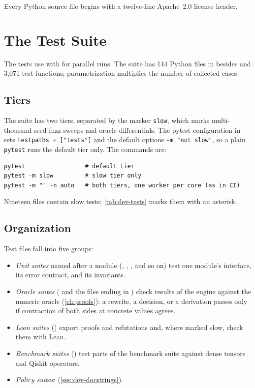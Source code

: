 Every Python source file begins with a twelve-line Apache~2.0 license header.

\section{The Test Suite}\label{sec:dev-tests}

The tests use  with  for parallel runs. The suite has 144 Python files in  besides  and 3{,}071 test functions; parametrization multiplies the number of collected cases.

\subsection{Tiers}\label{sec:dev-tiers}

The suite has two tiers, separated by the marker \texttt{slow}, which marks multi-thousand-seed fuzz sweeps and oracle differentials. The pytest configuration in  sets \texttt{testpaths = ["tests"]} and the default options \texttt{-m "not slow"}, so a plain \texttt{pytest} runs the default tier only. The commands are:
\begin{lstlisting}[style=shell]
pytest                 # default tier
pytest -m slow         # slow tier only
pytest -m "" -n auto   # both tiers, one worker per core (as in CI)
\end{lstlisting}
Nineteen files contain slow tests; \cref{tab:dev-tests} marks them with an asterisk.

\subsection{Organization}\label{sec:dev-test-organization}

Test files fall into five groups:
\begin{itemize}
\item \emph{Unit suites} named after a module (, , , and so on) test one module's interface, its error contract, and its invariants.
\item \emph{Oracle suites} ( and the files ending in ) check results of the engine against the numeric oracle (\cref{ch:proofs}): a rewrite, a decision, or a derivation passes only if contraction of both sides at concrete values agrees.
\item \emph{Lean suites} () export proofs and refutations and, where marked slow, check them with Lean.
\item \emph{Benchmark suites} () test parts of the benchmark suite against dense tensors and Qiskit operators.
\item \emph{Policy suites}:  (\cref{sec:dev-docstrings}).
\end{itemize}

